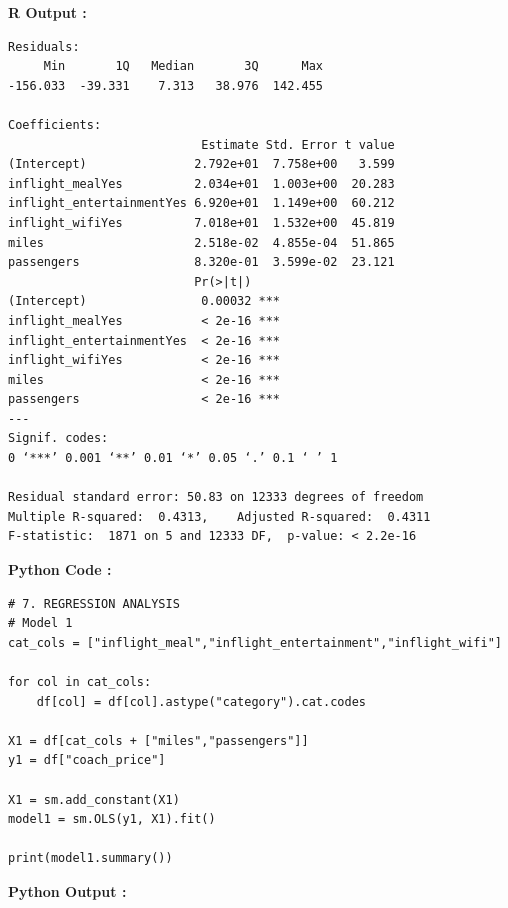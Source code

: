 \documentclass[11pt,a4paper]{article}
\begin{document}
\vspace{0.5em}
\noindent \textbf{R Output :}
\begin{verbatim}
Residuals:
     Min       1Q   Median       3Q      Max 
-156.033  -39.331    7.313   38.976  142.455 

Coefficients:
                           Estimate Std. Error t value
(Intercept)               2.792e+01  7.758e+00   3.599
inflight_mealYes          2.034e+01  1.003e+00  20.283
inflight_entertainmentYes 6.920e+01  1.149e+00  60.212
inflight_wifiYes          7.018e+01  1.532e+00  45.819
miles                     2.518e-02  4.855e-04  51.865
passengers                8.320e-01  3.599e-02  23.121
                          Pr(>|t|)    
(Intercept)                0.00032 ***
inflight_mealYes           < 2e-16 ***
inflight_entertainmentYes  < 2e-16 ***
inflight_wifiYes           < 2e-16 ***
miles                      < 2e-16 ***
passengers                 < 2e-16 ***
---
Signif. codes:  
0 ‘***’ 0.001 ‘**’ 0.01 ‘*’ 0.05 ‘.’ 0.1 ‘ ’ 1

Residual standard error: 50.83 on 12333 degrees of freedom
Multiple R-squared:  0.4313,	Adjusted R-squared:  0.4311 
F-statistic:  1871 on 5 and 12333 DF,  p-value: < 2.2e-16

\end{verbatim}
\vspace{0.5em}
\newpage
\noindent \textbf{Python Code :}
\begin{codebox}
\begin{lstlisting}[style=Pythonstyle]
# 7. REGRESSION ANALYSIS
# Model 1
cat_cols = ["inflight_meal","inflight_entertainment","inflight_wifi"]

for col in cat_cols:
    df[col] = df[col].astype("category").cat.codes

X1 = df[cat_cols + ["miles","passengers"]]
y1 = df["coach_price"]

X1 = sm.add_constant(X1)
model1 = sm.OLS(y1, X1).fit()

print(model1.summary())
\end{lstlisting}
\end{codebox}
\vspace{0.5em}
\noindent \textbf{Python Output :}
\end{document}
